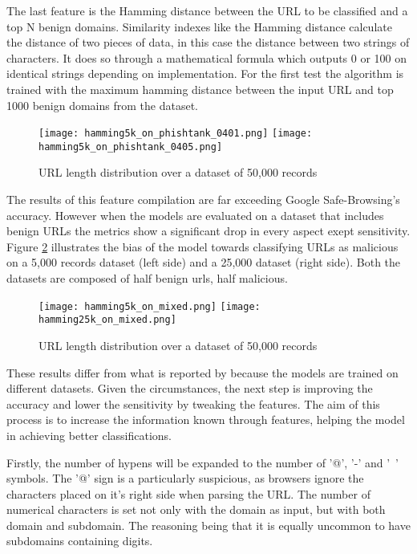 	The last feature is the Hamming distance between the URL to be classified and a top N benign domains. Similarity indexes like the Hamming distance calculate the distance of two pieces of data, in this case the distance between two strings of characters. It does so through a mathematical formula which outputs 0 or 100 on identical strings depending on implementation. For the first test the algorithm is trained with the maximum hamming distance between the input URL and top 1000 benign domains from the \cite{MAJESTIC_MILLION} dataset.

	\begin{figure}
		\centering
		\texttt{[image: hamming5k\_on\_phishtank\_0401.png]}
		\texttt{[image: hamming5k\_on\_phishtank\_0405.png]}
		\caption{URL length distribution over a dataset of 50,000 records}
		\label{fig:HAMMING_ON_PHISHTANK}
	\end{figure}

	The results of this feature compilation are far exceeding Google Safe-Browsing's accuracy. However when the models are evaluated on a dataset that includes benign URLs the metrics show a significant drop in every aspect exept sensitivity. Figure \ref{fig:HAMMING_ON_MIXED} illustrates the bias of the model towards classifying URLs as malicious on a 5,000 records dataset (left side) and a 25,000 dataset (right side). Both the datasets are composed of half benign urls, half malicious.

	\begin{figure}[b]
		\centering
		\texttt{[image: hamming5k\_on\_mixed.png]}	\texttt{[image: hamming25k\_on\_mixed.png]}
		\caption{URL length distribution over a dataset of 50,000 records}
		\label{fig:HAMMING_ON_MIXED}
	\end{figure}

	These results differ from what is reported by \cite{SVM_SIMILARITY_INDEX} because the models are trained on different datasets. Given the circumstances, the next step is improving the accuracy and lower the sensitivity by tweaking the features. The aim of this process is to increase the information known through features, helping the model in achieving better classifications.

	Firstly, the number of hypens will be expanded to the number of '@', '-' and '~' symbols. The '@' sign is a particularly suspicious, as browsers ignore the characters placed on it's right side when parsing the URL. The number of numerical characters is set not only with the domain as input, but with both domain and subdomain. The reasoning being that it is equally uncommon to have subdomains containing digits.

